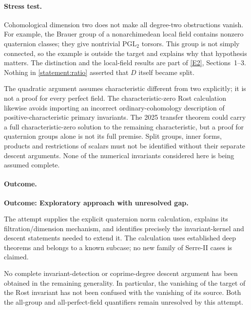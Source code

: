 \documentclass[11pt,a4paper]{article}
\newcommand{\eref}[2]{\hyperlink{extra:#1:#2}{[E#2]}}
\numberwithin{equation}{section}
\begin{document}
\paragraph{Stress test.}
Cohomological dimension two does not make all degree-two obstructions
vanish. For example, the Brauer group of a nonarchimedean local field
contains nonzero quaternion classes; they give nontrivial
$\mathrm{PGL}_2$ torsors. This group is not simply connected, so the
example is outside the target and explains why that hypothesis matters.
The distinction and the local-field results are part of
\eref{statement}{2}, Sections~1--3. Nothing in \eqref{statement:ratio} asserted that
$D$ itself became split.

The quadratic argument assumes characteristic different from two
explicitly; it is not a proof for every perfect field. The
characteristic-zero Rost calculation likewise avoids importing an
incorrect ordinary-cohomology description of positive-characteristic
primary invariants. The 2025 transfer theorem could carry a full
characteristic-zero solution to the remaining characteristic, but a
proof for quaternion groups alone is not its full premise. Split groups,
inner forms, products and restrictions of scalars must not be identified
without their separate descent arguments. None of the numerical
invariants considered here is being assumed complete.

\paragraph{Outcome.}
\textbf{Outcome: Exploratory approach with unresolved gap.}

The attempt supplies the explicit quaternion norm calculation, explains
its filtration/dimension mechanism, and identifies precisely the
invariant-kernel and descent statements needed to extend it. The
calculation uses established deep theorems and belongs to a known
subcase; no new family of Serre-II cases is claimed.

No complete invariant-detection or coprime-degree descent argument has
been obtained in the remaining generality. In particular, the vanishing
of the target of the Rost invariant has not been confused with the
vanishing of its source. Both the all-group and all-perfect-field
quantifiers remain unresolved by this attempt.
\end{document}
